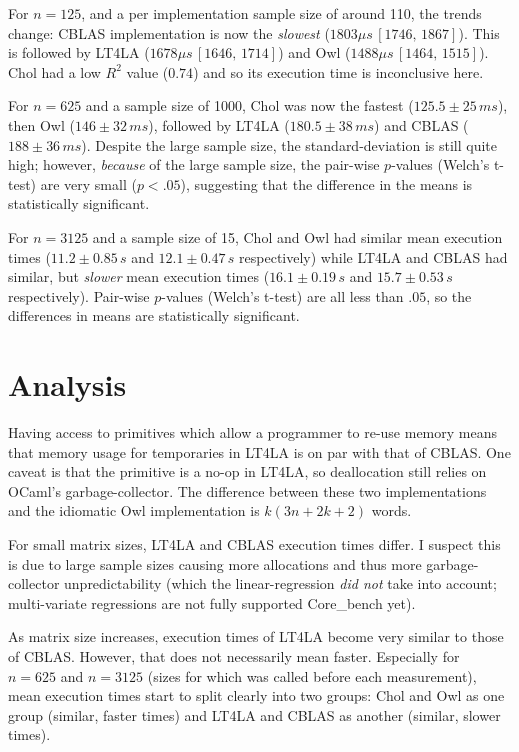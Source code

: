 For $n=125$, and a per implementation sample size of around 110, the trends change:
CBLAS implementation is now the \emph{slowest} ($1803 \mu s\, [1746,\, 1867]$).
This is followed by LT4LA ($1678 \mu s\, [1646,\, 1714]$) and Owl ($1488 \mu
s\, [1464,\, 1515]$). Chol had a low $R^2$ value ($0.74$) and so its execution
time is inconclusive here.

For $n=625$ and a sample size of 1000, Chol was now the fastest ($125.5 \pm
25\,ms$), then Owl ($146 \pm 32 \,ms$), followed by LT4LA ($180.5 \pm 38 \,ms$)
and CBLAS ($188 \pm 36 \, ms$). Despite the large sample size, the
standard-deviation is still quite high; however, \emph{because} of the large
sample size, the pair-wise $p$-values (Welch's t-test) are very small ($p <
.05$), suggesting that the difference in the means is statistically
significant.

For $n=3125$ and a sample size of 15, Chol and Owl had similar mean execution
times ($11.2 \pm 0.85 \,s$ and $12.1 \pm 0.47 \,s$ respectively) while LT4LA
and CBLAS had similar, but \emph{slower} mean execution times ($16.1 \pm 0.19
\,s$ and $15.7 \pm 0.53 \,s$ respectively). Pair-wise $p$-values (Welch's
t-test) are all less than $.05$, so the differences in means are statistically
significant.

\section{Analysis}

Having access to primitives which allow a programmer to re-use memory means
that memory usage for temporaries in LT4LA is on par with that of CBLAS. One
caveat is that the  primitive is a no-op in LT4LA, so deallocation
still relies on OCaml's garbage-collector. The difference between these two
implementations and the idiomatic Owl implementation is $k(3n+2k+2)$ words.

For small matrix sizes, LT4LA and CBLAS execution times differ. I suspect this
is due to large sample sizes causing more allocations and thus more
garbage-collector unpredictability (which the linear-regression \emph{did not}
take into account; multi-variate regressions are not fully supported
Core\_bench yet).

As matrix size increases, execution times of LT4LA become very similar to those
of CBLAS. However, that does not necessarily mean faster.  Especially for
$n=625$ and $n=3125$ (sizes for which  was called before
each measurement), mean execution times start to split clearly into two groups:
Chol and Owl as one group (similar, faster times) and LT4LA and CBLAS as
another (similar, slower times).

